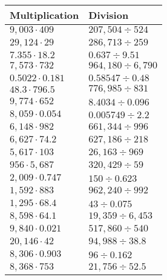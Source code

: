 \begin{longtable}[]{@{}ll@{}}
\toprule
Multiplication & Division\tabularnewline
\midrule
\endhead
\(9,003\cdot409\) & \(207,504÷524\)\tabularnewline
\(29,124\cdot29\) & \(286,713÷259\)\tabularnewline
\(7.355\cdot18.2\) & \(0.637÷9.51\)\tabularnewline
\(7,573\cdot732\) & \(964,180÷6,790\)\tabularnewline
\(0.5022\cdot0.181\) & \(0.58547÷0.48\)\tabularnewline
\(48.3\cdot796.5\) & \(776,985÷831\)\tabularnewline
\(9,774\cdot652\) & \(8.4034÷0.096\)\tabularnewline
\(8,059\cdot0.054\) & \(0.005749 ÷2.2\)\tabularnewline
\(6,148\cdot982\) & \(661,344÷996\)\tabularnewline
\(6,627\cdot74.2\) & \(627,186÷218\)\tabularnewline
\(5,617\cdot103\) & \(26,163÷969\)\tabularnewline
\(956\cdot5,687\) & \(320,429÷59\)\tabularnewline
\(2,009\cdot0.747\) & \(150÷0.623\)\tabularnewline
\(1,592\cdot883\) & \(962,240÷992\)\tabularnewline
\(1,295\cdot68.4\) & \(43÷0.075\)\tabularnewline
\(8,598\cdot64.1\) & \(19,359÷6,453\)\tabularnewline
\(9,840\cdot0.021\) & \(517,860÷540\)\tabularnewline
\(20,146\cdot42\) & \(94,988÷38.8\)\tabularnewline
\(8,306\cdot0.903\) & \(96÷0.162\)\tabularnewline
\(8,368\cdot753\) & \(21,756÷52.5\)\tabularnewline
\bottomrule
\end{longtable}
